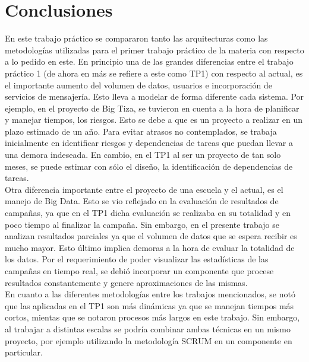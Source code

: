 \section{Conclusiones}

En este trabajo práctico se compararon tanto las arquitecturas como las metodologías utilizadas para el primer trabajo práctico de la materia con respecto a lo pedido en este.
En principio una de las grandes diferencias entre el trabajo práctico 1 (de ahora en más se refiere a este como TP1) con respecto al actual, es el importante aumento del volumen de datos, usuarios e incorporación de servicios de mensajería. 
Esto lleva a modelar de forma diferente cada sistema. Por ejemplo, en el proyecto de Big Tiza, se tuvieron en cuenta a la hora de planificar y manejar tiempos, los riesgos. Esto se debe a que es un proyecto a realizar en un plazo estimado de un año. Para evitar atrasos no contemplados, se trabaja inicialmente en identificar riesgos y dependencias de tareas que puedan llevar a una demora indeseada. En cambio, en el TP1 al ser un proyecto de tan solo meses, se puede estimar con sólo el diseño, la identificación de dependencias de tareas. \\
Otra diferencia importante entre el proyecto de una escuela y el actual, es el manejo de Big Data. Esto se vio reflejado en la evaluación de resultados de campañas, ya que en el TP1 dicha evaluación se realizaba en su totalidad y en poco tiempo al finalizar la campaña. Sin embargo, en el presente trabajo se analizan resultados parciales ya que el volumen de datos que se espera recibir es mucho mayor. Esto último implica demoras a la hora de evaluar la totalidad de los datos. Por el requerimiento de poder visualizar las estadísticas de las campañas en tiempo real, se debió incorporar un componente que procese resultados constantemente y genere aproximaciones de las mismas. \\
En cuanto a las diferentes metodologías entre los trabajos mencionados, se notó que las aplicadas en el TP1 son más dinámicas ya que se manejan tiempos más cortos, mientas que se notaron procesos más largos en este trabajo. Sin embargo, al trabajar a distintas escalas se podría combinar ambas técnicas en un mismo proyecto, por ejemplo utilizando la metodología SCRUM en un componente en particular. 

